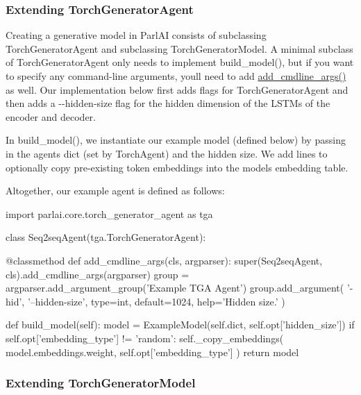 \subsubsection*{Extending {\ttfamily Torch\+Generator\+Agent}}

Creating a generative model in Parl\+AI consists of subclassing {\ttfamily Torch\+Generator\+Agent} and subclassing {\ttfamily Torch\+Generator\+Model}. A minimal subclass of {\ttfamily Torch\+Generator\+Agent} only needs to implement {\ttfamily build\+\_\+model()}, but if you want to specify any command-\/line arguments, you\textquotesingle{}ll need to add {\ttfamily \hyperlink{namespaceparlai_1_1agents_1_1drqa_1_1config_a62fdd5554f1da6be0cba185271058320}{add\+\_\+cmdline\+\_\+args()}} as well. Our implementation below first adds flags for {\ttfamily Torch\+Generator\+Agent} and then adds a {\ttfamily -\/-\/hidden-\/size} flag for the hidden dimension of the L\+S\+T\+Ms of the encoder and decoder.

In {\ttfamily build\+\_\+model()}, we instantiate our example model (defined below) by passing in the agent\textquotesingle{}s dict (set by {\ttfamily Torch\+Agent}) and the hidden size. We add lines to optionally copy pre-\/existing token embeddings into the model\textquotesingle{}s embedding table.

Altogether, our example agent is defined as follows\+:


\begin{DoxyCode}
import parlai.core.torch\_generator\_agent as tga


class Seq2seqAgent(tga.TorchGeneratorAgent):

    @classmethod
    def add\_cmdline\_args(cls, argparser):
        super(Seq2seqAgent, cls).add\_cmdline\_args(argparser)
        group = argparser.add\_argument\_group('Example TGA Agent')
        group.add\_argument(
            '-hid', '--hidden-size', type=int, default=1024, help='Hidden size.'
        )

    def build\_model(self):
        model = ExampleModel(self.dict, self.opt['hidden\_size'])
        if self.opt['embedding\_type'] != 'random':
            self.\_copy\_embeddings(
                model.embeddings.weight, self.opt['embedding\_type']
            )
        return model
\end{DoxyCode}


\subsubsection*{Extending {\ttfamily Torch\+Generator\+Model}}

